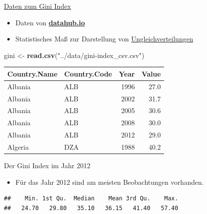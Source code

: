 \documentclass[ignorenonframetext,]{beamer}
\newenvironment{Shaded}{\begin{snugshade}}{\end{snugshade}}
\newcommand{\KeywordTok}[1]{\textcolor[rgb]{0.13,0.29,0.53}{\textbf{#1}}}
\newcommand{\DecValTok}[1]{\textcolor[rgb]{0.00,0.00,0.81}{#1}}
\newcommand{\StringTok}[1]{\textcolor[rgb]{0.31,0.60,0.02}{#1}}
\newcommand{\OperatorTok}[1]{\textcolor[rgb]{0.81,0.36,0.00}{\textbf{#1}}}
\newcommand{\NormalTok}[1]{#1}
\providecommand{\tightlist}{%
  \setlength{\itemsep}{0pt}\setlength{\parskip}{0pt}}
\begin{document}
\begin{frame}[fragile]{\href{https://datahub.io/core/gini-index\#data}{Daten
zum Gini Index}}

\begin{itemize}
\tightlist
\item
  Daten von
  \href{https://datahub.io/core/gini-index\#data}{\textbf{datahub.io}}
\item
  Statistisches Maß zur Darstellung von
  \href{https://de.wikipedia.org/wiki/Gini-Koeffizient}{Ungleichverteilungen}
\end{itemize}

\begin{Shaded}
\begin{Highlighting}[]
\NormalTok{gini <-}\StringTok{ }\KeywordTok{read.csv}\NormalTok{(}\StringTok{"../data/gini-index_csv.csv"}\NormalTok{)}
\end{Highlighting}
\end{Shaded}

\begin{longtable}[]{@{}llrr@{}}
\toprule
Country.Name & Country.Code & Year & Value\tabularnewline
\midrule
\endhead
Albania & ALB & 1996 & 27.0\tabularnewline
Albania & ALB & 2002 & 31.7\tabularnewline
Albania & ALB & 2005 & 30.6\tabularnewline
Albania & ALB & 2008 & 30.0\tabularnewline
Albania & ALB & 2012 & 29.0\tabularnewline
Algeria & DZA & 1988 & 40.2\tabularnewline
\bottomrule
\end{longtable}

\end{frame}

\begin{frame}[fragile]{Der Gini Index im Jahr 2012}

\begin{itemize}
\tightlist
\item
  Für das Jahr 2012 sind am meisten Beobachtungen vorhanden.
\end{itemize}

\begin{Shaded}
\end{Shaded}

\begin{verbatim}
##    Min. 1st Qu.  Median    Mean 3rd Qu.    Max. 
##   24.70   29.80   35.10   36.15   41.40   57.40
\end{verbatim}

\end{frame}
\end{document}
